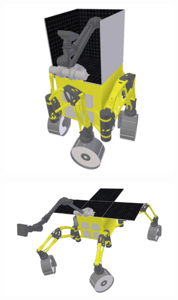 \begin{figure}[h]
\captionsetup[subfigure]{justification=centering}
\vspace{-2ex}
	\centering
    \setlength{\subfigureWidth}{0.50\textwidth}
    \setlength{\graphicsHeight}{53mm}
    \hypersetup{hidelinks=true}%
    \begin{subfigure}[t]{\subfigureWidth}
        \centering
        \includegraphics[height=\graphicsHeight]{sections/design/solar-array/images/iani-chaos-stowed.png}
		\label{fig:sub:solar-array-on-rover-for-iani-chaos-stowed}
    \end{subfigure}\hfill
    \begin{subfigure}[t]{\subfigureWidth}
        \centering
        \includegraphics[height=\graphicsHeight]{sections/design/solar-array/images/iani-chaos-10deg-pitch.png}

\end{subfigure}
\end{figure}
